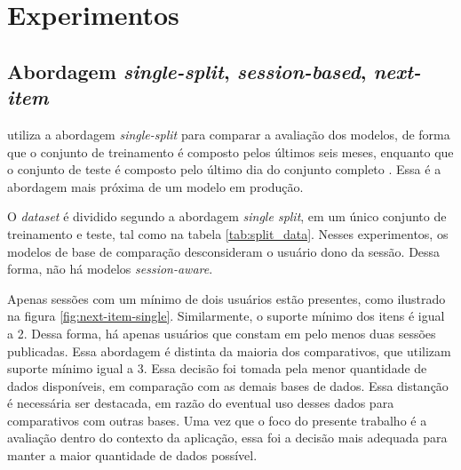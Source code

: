   \section{Experimentos} 


\subsection{Abordagem \textit{single-split}, \textit{session-based}, \textit{next-item}}

\citet{HidasiKBT15} utiliza a abordagem \textit{single-split} para comparar a
avaliação dos modelos, de forma que o conjunto de treinamento é composto pelos
últimos seis meses, enquanto que o conjunto de teste é composto pelo último dia
do conjunto completo \cite{ludewig_2018}. Essa é a abordagem mais próxima de um
modelo em produção.

O \textit{dataset} é dividido segundo a abordagem \textit{single split}, em um
único conjunto de treinamento e teste, tal como na tabela
\ref{tab:split_data}. Nesses experimentos, os modelos de base de comparação
desconsideram o usuário dono da sessão. Dessa forma, não há modelos
\textit{session-aware}.

Apenas sessões com um mínimo de dois usuários estão presentes, como ilustrado na
figura \ref{fig:next-item-single}. Similarmente, o suporte mínimo dos itens é
igual a 2. Dessa forma, há apenas usuários que constam em pelo menos duas
sessões publicadas. Essa abordagem é distinta da maioria dos comparativos, que
utilizam suporte mínimo igual a 3. Essa decisão foi tomada pela menor quantidade
de dados disponíveis, em comparação com as demais bases de dados. Essa distanção
é necessária ser destacada, em razão do eventual uso desses dados
para comparativos com outras bases. Uma vez que o foco do presente trabalho é a
avaliação dentro do contexto da aplicação, essa foi a decisão mais adequada para
manter a maior quantidade de dados possível.

